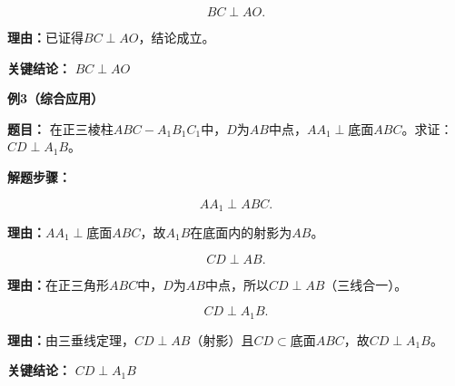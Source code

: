 \begin{examplebox}
\begin{description}[style=nextline, leftmargin=2.8em, labelsep=0.5em, itemsep=0.45em]
		\item[\textbf{第三步（结论）：}]
			\[
				BC\perp AO.
			\]
			\par\textbf{理由：}已证得$BC\perp AO$，结论成立。
	\end{description}

	\textbf{\textcolor{CExample}{关键结论：}}
	\textbf{$\boxed{BC\perp AO}$}

	\medskip
	\textbf{\textcolor{CExample}{例3（综合应用）}}

	\textbf{\textcolor{CExample}{题目：}}
	在正三棱柱$ABC-A_1B_1C_1$中，$D$为$AB$中点，$AA_1\perp$底面$ABC$。求证：$CD\perp A_1B$。

	\textbf{\textcolor{CExample}{解题步骤：}}
	\begin{description}[style=nextline, leftmargin=2.8em, labelsep=0.5em, itemsep=0.45em]
		\item[\textbf{第一步（确定射影）：}]
			\[
				AA_1\perp ABC.
			\]
			\par\textbf{理由：}$AA_1\perp$底面$ABC$，故$A_1B$在底面内的射影为$AB$。

		\item[\textbf{第二步（证面内垂直）：}]
			\[
				CD\perp AB.
			\]
			\par\textbf{理由：}在正三角形$ABC$中，$D$为$AB$中点，所以$CD\perp AB$（三线合一）。

		\item[\textbf{第三步（套用结论）：}]
			\[
				CD\perp A_1B.
			\]
			\par\textbf{理由：}由三垂线定理，$CD\perp AB$（射影）且$CD\subset$底面$ABC$，故$CD\perp A_1B$。
	\end{description}

	\textbf{\textcolor{CExample}{关键结论：}}
	\textbf{$\boxed{CD\perp A_1B}$}
\end{examplebox}
